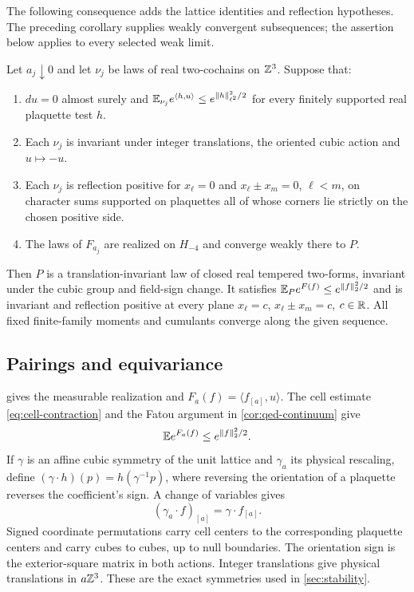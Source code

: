 The following consequence adds the lattice identities and reflection
hypotheses. The preceding corollary supplies weakly convergent
subsequences; the assertion below applies to every selected weak limit.

\begin{corollary}\label{cor:plaquette-limit}
Let \(a_j\downarrow0\) and let \(\nu_j\) be laws of real
two-cochains on \(\mathbb Z^3\). Suppose that:
\begin{enumerate}[label=(\roman*),leftmargin=*]
\item \(du=0\) almost surely and
\(\mathbb E_{\nu_j}e^{\langle h,u\rangle}\le e^{\|h\|_{\ell^2}^2/2}\)
for every finitely supported real plaquette test \(h\).
\item Each \(\nu_j\) is invariant under integer translations,
the oriented cubic action and \(u\mapsto-u\).
\item Each \(\nu_j\) is reflection positive for
\(x_\ell=0\) and \(x_\ell\pm x_m=0\), \(\ell<m\),
on character sums supported on plaquettes all of whose corners
lie strictly on the chosen positive side.
\item The laws of \(F_{a_j}\) are realized on \(H_{-4}\) and
converge weakly there to \(P\).
\end{enumerate}
Then \(P\) is a translation-invariant law of closed real tempered
two-forms, invariant under the cubic group and field-sign change.
It satisfies \(\mathbb E_Pe^{F(f)}\le e^{\|f\|_2^2/2}\) and is invariant
and reflection positive at every plane
\(x_\ell=c\), \(x_\ell\pm x_m=c\), \(c\in\mathbb R\).
All fixed finite-family moments and cumulants converge along
the given sequence.
\end{corollary}

\subsection{Pairings and equivariance}
 gives the measurable realization and
\(F_a(f)=\langle f_{[a]},u\rangle\). The cell estimate
\eqref{eq:cell-contraction} and the Fatou argument in
\cref{cor:qed-continuum} give
\begin{equation}\label{eq:step-gaussian}
 \mathbb E e^{F_a(f)}\le e^{\|f\|_2^2/2}.
\end{equation}
If \(\gamma\) is an affine cubic symmetry of the unit lattice
and \(\gamma_a\) its physical rescaling, define
\((\gamma\cdot h)(p)=h(\gamma^{-1}p)\), where reversing the
orientation of a plaquette reverses the coefficient's sign.
A change of variables gives
\begin{equation}\label{eq:limit-test-equivariance}
 (\gamma_a\cdot f)_{[a]}=\gamma\cdot f_{[a]}.
\end{equation}
Signed coordinate permutations carry cell centers to the corresponding
plaquette centers and carry cubes to cubes, up to null boundaries.
The orientation sign is the exterior-square matrix in both actions.
Integer translations give physical translations in \(a\mathbb Z^3\).
These are the exact symmetries used in \cref{sec:stability}.

